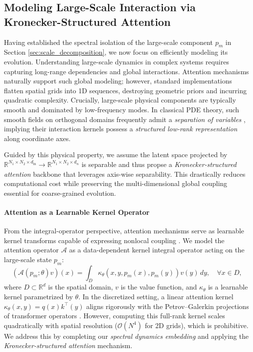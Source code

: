 \documentclass[final,3p,times]{elsarticle}
\begin{document}
\subsection{Modeling Large-Scale Interaction via Kronecker-Structured Attention}\label{sec:kronecker_attention}
Having established the spectral isolation of the large-scale component $p_m$ in Section \ref{sec:scale_decomposition}, we now focus on efficiently modeling its evolution. Understanding large-scale dynamics in complex systems requires capturing long-range dependencies and global interactions. Attention mechanisms naturally support such global modeling; however, standard implementations flatten spatial grids into 1D sequences, destroying geometric priors and incurring quadratic complexity. 
Crucially, large-scale physical components are typically smooth and dominated by low-frequency modes. In classical PDE theory, such smooth fields on orthogonal domains frequently admit a \emph{separation of variables} \cite{evans2022partial}, implying their interaction kernels possess a \emph{structured low-rank representation} along coordinate axes. 

Guided by this physical property, we assume the latent space projected by $\mathbb{R}^{N_1 \times N_2 \times d_{\text{in}}} \rightarrow \mathbb{R}^{N_1 \times N_2 \times d_n}$ is separable and thus propse a \textit{Kronecker-structured attention} backbone that leverages axis-wise separability. This drastically reduces computational cost while preserving the multi-dimensional global coupling essential for coarse-grained evolution.

\paragraph{Attention as a Learnable Kernel Operator}
From the integral-operator perspective, attention mechanisms serve as learnable kernel transforms capable of expressing nonlocal coupling \cite{cao2021choose}. We model the attention operator $\mathcal{A}$ as a data-dependent kernel integral operator acting on the large-scale state $p_m$:
\begin{equation}
(\mathcal{A}(p_m;\theta)v)(x) = \int_{D} \kappa_{\theta}(x, y, p_m(x), p_m(y)) v(y) \, dy, \quad \forall x \in D,
\label{eq:attention_integral}
\end{equation}
where $D \subset \mathbb{R}^d$ is the spatial domain, $v$ is the value function, and $\kappa_{\theta}$ is a learnable kernel parametrized by $\theta$. In the discretized setting, a linear attention kernel $\kappa_{\theta}(x, y) = q(x) k^{\top}(y)$ aligns rigorously with the Petrov–Galerkin projections of transformer operators \cite{cao2021choose}. However, computing this full-rank kernel scales quadratically with spatial resolution ($\mathcal{O}(N^4)$ for 2D grids), which is prohibitive. We address this by completing our \textit{spectral dynamics embedding} and applying the \textit{Kronecker-structured attention} mechanism.
\end{document}
